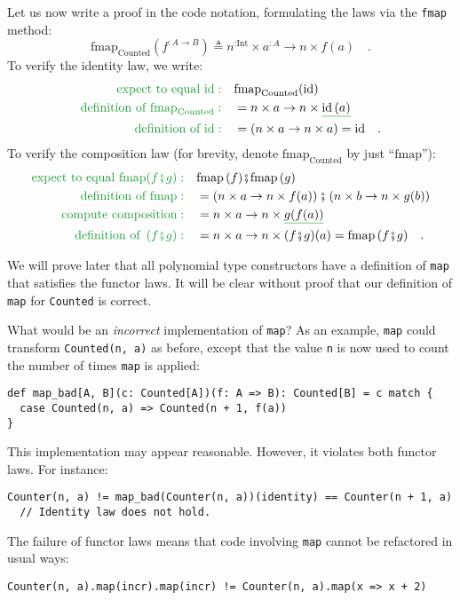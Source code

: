 Let us now write a proof in the code notation, formulating the laws
via the \lstinline!fmap! method:
\[
\text{fmap}_{\text{Counted}}(f^{:A\rightarrow B})\triangleq n^{:\text{Int}}\times a^{:A}\rightarrow n\times f(a)\quad.
\]
To verify the identity law, we write:
\begin{align*}
{\color{greenunder}\text{expect to equal }\text{id}:}\quad & \text{fmap}_{\text{Counted}}(\text{id})\\
{\color{greenunder}\text{definition of }\text{fmap}_{\text{Counted}}:}\quad & =n\times a\rightarrow n\times\gunderline{\text{id}\,(a)}\\
{\color{greenunder}\text{definition of }\text{id}:}\quad & =\left(n\times a\rightarrow n\times a\right)=\text{id}\quad.
\end{align*}
To verify the composition law (for brevity, denote $\text{fmap}_{\text{Counted}}$
by just \textsf{``}$\text{fmap}$\textsf{''}):
\begin{align*}
{\color{greenunder}\text{expect to equal }\text{fmap}(f\bef g):}\quad & \text{fmap}\,(f)\bef\text{fmap}\,(g)\\
{\color{greenunder}\text{definition of }\text{fmap}:}\quad & =\left(n\times a\rightarrow n\times f(a)\right)\bef\left(n\times b\rightarrow n\times g(b)\right)\\
{\color{greenunder}\text{compute composition}:}\quad & =n\times a\rightarrow n\times\gunderline{g(f(a))}\\
{\color{greenunder}\text{definition of }\left(f\bef g\right):}\quad & =n\times a\rightarrow n\times(f\bef g)(a)=\text{fmap}\,(f\bef g)\quad.
\end{align*}

We will prove later that all polynomial type constructors have a definition
of \lstinline!map! that satisfies the functor laws. It will be clear
without proof that our definition of \lstinline!map! for \lstinline!Counted!
is correct. 

What would be an \emph{incorrect} implementation of \lstinline!map!?
As an example, \lstinline!map! could transform \lstinline!Counted(n, a)!
as before, except that the value \lstinline!n! is now used to count
the number of times \lstinline!map! is applied:
\begin{lstlisting}
def map_bad[A, B](c: Counted[A])(f: A => B): Counted[B] = c match {
  case Counted(n, a) => Counted(n + 1, f(a))
}
\end{lstlisting}
This implementation may appear reasonable. However, it violates both
functor laws. For instance:
\begin{lstlisting}
Counter(n, a) != map_bad(Counter(n, a))(identity) == Counter(n + 1, a)
  // Identity law does not hold.
\end{lstlisting}
The failure of functor laws means that code involving \lstinline!map!
cannot be refactored in usual ways:
\begin{lstlisting}
Counter(n, a).map(incr).map(incr) != Counter(n, a).map(x => x + 2)
\end{lstlisting}

